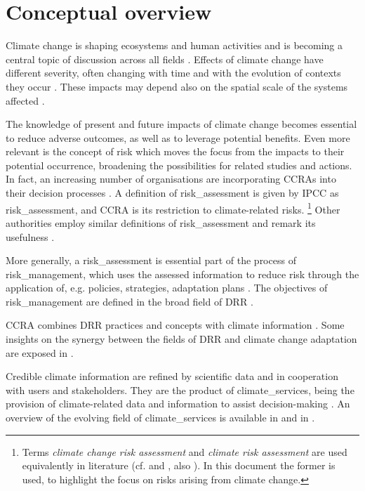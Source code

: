 \section{Conceptual overview}
\label{sec:Conceptual overview}
Climate change is shaping ecosystems and human activities and is becoming a central topic of discussion across all fields \cite{2022PortnerClimateChange,2022PortnerTechnicalSummary}. Effects of climate change have different severity, often changing with time and with the evolution of contexts they occur \cite{2024EEAExecutiveSummary}. These impacts may depend also on the spatial scale of the systems affected \cite{2021Doblas-ReyesLinkingGlobal}.

The knowledge of present and future impacts of climate change becomes essential to reduce adverse outcomes, as well as to leverage potential benefits. Even more relevant is the concept of risk which moves the focus from the impacts to their potential occurrence, broadening the possibilities for related studies and actions.
In fact, an increasing number of organisations are incorporating \glspl{CCRA} into their decision processes \cite{2024Carlin2024Climate}. A definition of \gls{risk_assessment} is given by \gls{IPCC} as \glsdesc{risk_assessment}, and \gls{CCRA} is its restriction to climate-related \glspl{risk}.%
\footnote{Terms \emph{climate change risk assessment} and \emph{climate risk assessment} are used equivalently in literature (cf. \cite[11]{2017GIZRiskSupplement} and \cite[20]{2017GIZTheVulnerability}, also \cite{2024LoyerInventoryOf}). In this document the former is used, to highlight the focus on risks arising from climate change.}
Other authorities employ similar definitions of \gls{risk_assessment} and remark its usefulness \cite{2021ISO14091,2019UNDRRGlobalAssessment}.

More generally, a \gls{risk_assessment} is essential part of the process of \gls{risk_management}, which uses the assessed information to reduce risk through the application of, e.g. policies, strategies, adaptation plans \cite{2018ISO31000}. The objectives of \gls{risk_management} are defined in the broad field of \gls{DRR} \cite{2016UNSecretary-GeneralReportOf}.

\Gls{CCRA} combines \gls{DRR} practices and concepts with climate information \cite{2017GIZRiskSupplement,2012FieldManagingThe}. Some insights on the synergy between the fields of \gls{DRR} and climate change adaptation are exposed in \cite[469-471]{2012FieldManagingThe}.

Credible climate information are refined by scientific data and in cooperation with users and stakeholders. They are the product of \glspl{climate_service}, being the provision of climate-related data and information to assist decision-making \cite{2012HewittTheGlobal}. An overview of the evolving field of \glspl{climate_service} is available in \cite[1431-1433]{2021Doblas-ReyesLinkingGlobal} and in \cite[1862-1869]{2021RanasingheClimateChange}.

